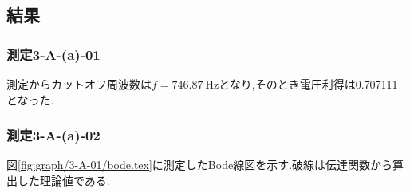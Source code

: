 \subsection{結果}
\subsubsection{測定3-A-(a)-01}
測定からカットオフ周波数は$f=746.87\ \si{\hertz}$となり,そのとき電圧利得は0.707111となった.
\subsubsection{測定3-A-(a)-02}
図\ref{fig:graph/3-A-01/bode.tex}に測定したBode線図を示す.破線は伝達関数から算出した理論値である.
